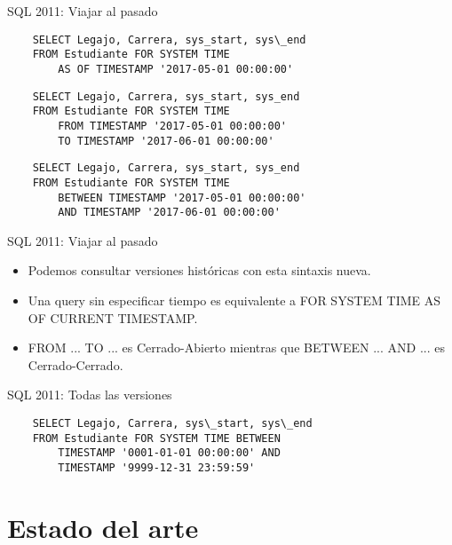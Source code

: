 \documentclass[handout, t, aspectratio=169]{beamer}
\begin{document}
\begin{frame}[fragile]{SQL 2011: Viajar al pasado}
    \begin{verbatim}
    SELECT Legajo, Carrera, sys_start, sys\_end
    FROM Estudiante FOR SYSTEM TIME
        AS OF TIMESTAMP '2017-05-01 00:00:00'
    \end{verbatim}\pause
    \begin{verbatim}
    SELECT Legajo, Carrera, sys_start, sys_end
    FROM Estudiante FOR SYSTEM TIME
        FROM TIMESTAMP '2017-05-01 00:00:00'
        TO TIMESTAMP '2017-06-01 00:00:00'
    \end{verbatim}\pause
    \begin{verbatim}
    SELECT Legajo, Carrera, sys_start, sys_end
    FROM Estudiante FOR SYSTEM TIME
        BETWEEN TIMESTAMP '2017-05-01 00:00:00'
        AND TIMESTAMP '2017-06-01 00:00:00'
    \end{verbatim}
\end{frame}

\begin{frame}[fragile]{SQL 2011: Viajar al pasado}
    \begin{itemize}
        \item Podemos consultar versiones históricas con esta sintaxis nueva.\pause
        \item Una query sin especificar tiempo es equivalente a FOR SYSTEM TIME AS OF CURRENT TIMESTAMP.\pause
        \item FROM ... TO ... es Cerrado-Abierto mientras que BETWEEN ... AND ... es Cerrado-Cerrado.
    \end{itemize}
\end{frame}

\begin{frame}[fragile]{SQL 2011: Todas las versiones}
    \begin{verbatim}
    SELECT Legajo, Carrera, sys\_start, sys\_end
    FROM Estudiante FOR SYSTEM TIME BETWEEN
        TIMESTAMP '0001-01-01 00:00:00' AND
        TIMESTAMP '9999-12-31 23:59:59'
    \end{verbatim}
\end{frame}

\section{Estado del arte}
\end{document}

